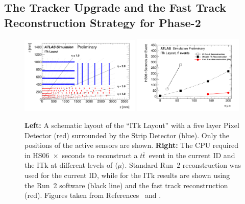 
\subsection{The Tracker Upgrade and the Fast Track Reconstruction Strategy for Phase-2}
\label{sub:ITKFastTrack}

%
\begin{figure}[htb!]
  \centering
  \includegraphics[width=0.51\textwidth]{figures/HitsRZ_Half_ITkLayout}
   \includegraphics[width=0.47\textwidth]{figures/Timing_fast_ITkLayout_Run2}
  \caption{{\bf Left:} A schematic layout of the ``ITk Layout'' with a five layer Pixel Detector (red) surrounded by the Strip Detector (blue). Only the positions of the active sensors are shown. {\bf Right:} The CPU required in HS06~$\times$~seconds to reconstruct a $t\bar{t}$~event in the current ID and the ITk at different levels of $\langle\mu\rangle$. Standard Run~2 reconstruction was used for the current ID, while for the ITk results are shown using the Run~2 software (black line) and the fast track reconstruction (red). Figures taken from References~\cite{ATL-PHYS-PUB-2019-014} and \cite{ATL-PHYS-PUB-2019-041}.}
  \label{fig:ITkandCPU}
\end{figure}

